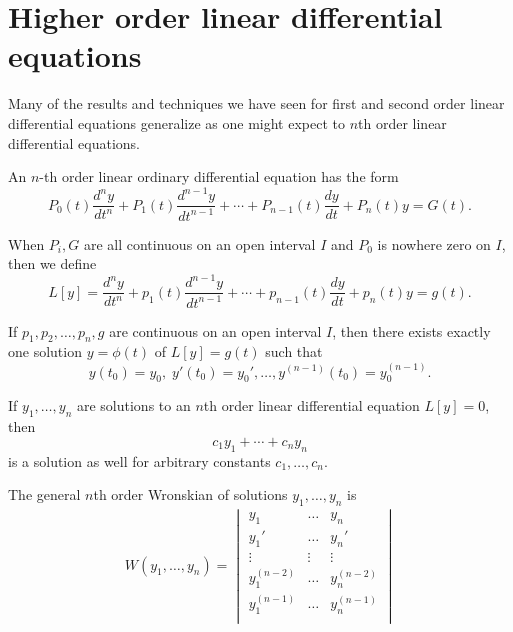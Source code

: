 \section{Higher order linear differential equations}

Many of the results and techniques we have seen for first and second order linear differential equations generalize as one might expect to $n$th order linear differential equations.

\begin{defn}
    An $n$-th order linear ordinary differential equation has the form
    \[P_0(t)\frac{d^ny}{dt^n} + P_1(t)\frac{d^{n-1}y}{dt^{n-1}} + \cdots + P_{n-1}(t)\frac{dy}{dt} + P_n(t)y = G(t).\]
\end{defn}

\begin{defn}
    When $P_i, G$ are all continuous on an open interval $I$ and $P_0$ is nowhere zero on $I$, then we define
    \[L[y] = \frac{d^ny}{dt^n} + p_1(t)\frac{d^{n-1}y}{dt^{n-1}} + \cdots + p_{n-1}(t)\frac{dy}{dt} + p_n(t)y = g(t).\]
\end{defn}

\begin{thm}\label{nth-order-linear-existence-uniqueness}
    If $p_1, p_2, \ldots, p_n, g$ are continuous on an open interval $I$, then there exists exactly one solution $y = \phi(t)$ of $L[y] = g(t)$ such that
    \[y(t_0) = y_0,\; y'(t_0) = y_0',\ldots, y^{(n-1)}(t_0) = y_0^{(n-1)}.\]
\end{thm}

\begin{rmk}
    If $y_1, \ldots, y_n$ are solutions to an $n$th order linear differential equation $L[y] = 0$, then
    \[c_1y_1 + \cdots + c_ny_n\] is a solution as well for arbitrary constants $c_1, \ldots, c_n$.
\end{rmk}

\begin{defn}
    The general $n$th order Wronskian of solutions $y_1, \ldots, y_n$ is
    \begin{align*}
        W(y_1, \ldots, y_n) = \begin{vmatrix}
            y_1 & \ldots & y_n \\
            y_1' & \ldots & y_n' \\
            \vdots & \vdots & \vdots \\
            y_1^{(n-2)} & \ldots & y_n^{(n-2)} \\
            y_1^{(n-1)} & \ldots & y_n^{(n-1)} \\
        \end{vmatrix}
    \end{align*}
\end{defn}

